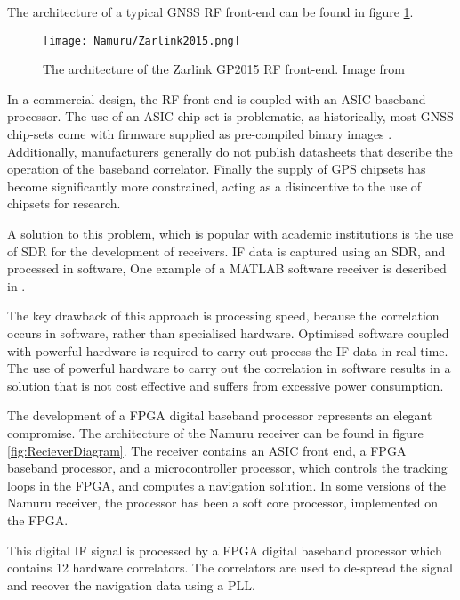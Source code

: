 The architecture of a typical \ac{GNSS} \ac{RF} front-end can be found in figure \ref{fig:Zarlink2015}.  

\begin{figure}[!htb] 
    \centering
    \texttt{[image: Namuru/Zarlink2015.png]} 
    \caption{The architecture of the Zarlink GP2015 \ac{RF} front-end. Image from \cite{Zarlink2015}}
    \label{fig:Zarlink2015}
\end{figure}

In a commercial design, the RF front-end is coupled with an \ac{ASIC} baseband processor. The use of an \ac{ASIC} chip-set is problematic, as historically, most \ac{GNSS} chip-sets come with firmware supplied as pre-compiled binary images \cite{Glennon11aquariusfirmware}. 
Additionally, manufacturers generally do not publish datasheets that describe the operation of the baseband correlator\cite{Glennon11aquariusfirmware}. Finally the supply of GPS chipsets has become significantly more constrained, acting as a disincentive to the use of chipsets for research.

A solution to this problem, which is popular with academic institutions is the use of \ac{SDR} for the development of receivers. \ac{IF} data is captured using an \ac{SDR}, and processed in software\cite{Glennon11aquariusfirmware}, One example of a MATLAB software receiver is described in \cite{KaiBorre}.

The key drawback of this approach is processing speed, because the correlation occurs in software, rather than specialised hardware. Optimised software coupled with powerful hardware is required to carry out process the \ac{IF} data in real time. The use of powerful hardware to carry out the correlation in software results in a solution that is not cost effective and suffers from excessive power consumption.

The development of a \ac{FPGA} digital baseband processor represents an elegant compromise. 
The architecture of the Namuru receiver can be found in figure \ref{fig:RecieverDiagram}. The receiver contains an \ac{ASIC} front end, a \ac{FPGA} baseband processor, and a microcontroller processor, which controls the tracking loops in the \ac{FPGA}, and computes a navigation solution. In some versions of the Namuru receiver, the processor has been a soft core processor, implemented on the \ac{FPGA}.

This digital \ac{IF} signal is processed by a \ac{FPGA} digital baseband processor which contains 12 hardware correlators. The correlators are used to de-spread the signal and recover the navigation data using a \ac{PLL}.

